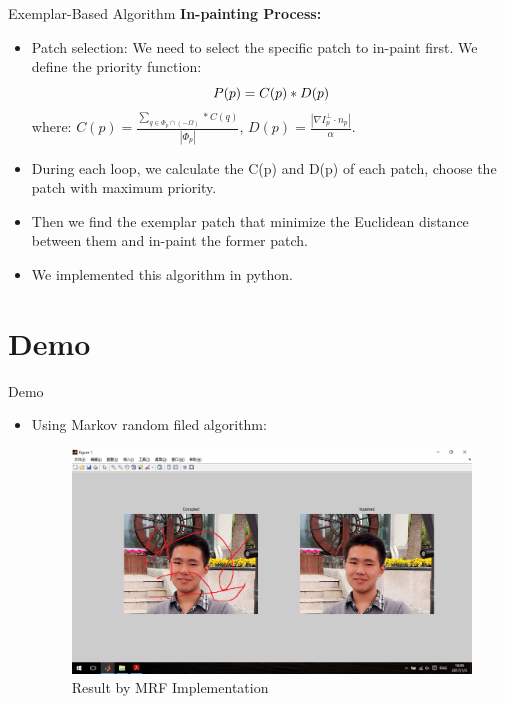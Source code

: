 \documentclass{beamer}
\begin{document}
\begin{frame}{Exemplar-Based Algorithm}
	\textbf{In-painting Process:}
	\begin{itemize}[<+->]
		\item Patch selection: We need to select the specific patch to in-paint first. We define the priority function:
		\begin{equation*}
		\centering
		P(p)=C(p)*D(p)
		\nonumber
		\end{equation*}
		where: $C(p)=\frac{\sum_{q\in \Phi _p\cap(-\Omega)}*C(q)}{|\Phi_p|}$, $D(p)=\frac{|\nabla I^\bot_p \cdot n_p|}{\alpha}$.
		\item During each loop, we calculate the C(p) and D(p) of each patch, choose the patch with maximum priority.
		\item Then we find the exemplar patch that minimize the Euclidean distance between them and in-paint the former patch.
		\item We implemented this algorithm in python.
	\end{itemize}
\end{frame}


\section{Demo}
\begin{frame}{Demo}
	\begin{itemize}
		\item Using Markov random filed algorithm:
		\begin{figure}
			\centering
			\includegraphics[width=1.0\linewidth]{rmf_result.png}
			\caption{Result by MRF Implementation}
		\end{figure}
	\end{itemize}
\end{frame}
\end{document}
